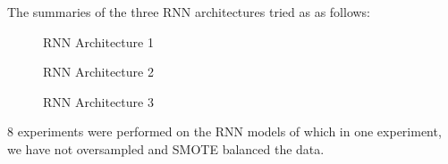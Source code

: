  The summaries of the three RNN architectures tried as as follows:
 
 \begin{figure}
%
  \caption{RNN Architecture 1}
  \label{fig:key}
\end{figure}

\begin{figure}
%
  \caption{RNN Architecture 2}
  \label{fig:key}
\end{figure}

\begin{figure}
%
  \caption{RNN Architecture 3}
  \label{fig:key}
\end{figure}
 
8 experiments were performed on the RNN models of which in one experiment, we have not oversampled and SMOTE balanced the data. 

